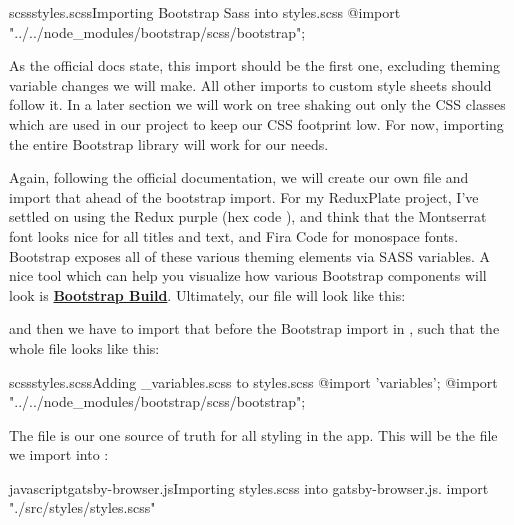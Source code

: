 \documentclass[paper=6in:9in,pagesize=pdftex,headinclude=on,footinclude=on,12pt,twoside]{scrbook}
\newcommand{\link}[2]{\textbf{\textcolor{monokaiPink}{\href{#2}{#1}}}}
\begin{document}
\begin{codeInput}{scss}{styles.scss}{Importing Bootstrap Sass into styles.scss}
@import "../../node_modules/bootstrap/scss/bootstrap";
\end{codeInput}

As the official docs state, this import should be the first one, excluding theming variable changes we will make. All other imports to custom style sheets should follow it. In a later section we will work on tree shaking out only the CSS classes which are used in our project to keep our CSS footprint low. For now, importing the entire Bootstrap library will work for our needs.


Again, following the official documentation, we will create our own  file and import that ahead of the bootstrap import. For my ReduxPlate project, I've settled on using the Redux purple (hex code ), and think that the Montserrat font looks nice for all titles and text, and Fira Code for monospace fonts. Bootstrap exposes all of these various theming elements via SASS variables. A nice tool which can help you visualize how various Bootstrap components will look is \link{Bootstrap Build}{https://bootstrap.build/app}. Ultimately, our  file will look like this:


and then we have to import that before the Bootstrap import in , such that the whole file looks like this:

\begin{codeInput}{scss}{styles.scss}{Adding \_variables.scss to styles.scss}
@import 'variables';
@import "../../node_modules/bootstrap/scss/bootstrap";
\end{codeInput}


The  file is our one source of truth for all styling in the app. This will be the file we import into :

\begin{codeInput}{javascript}{gatsby-browser.js}{Importing styles.scss into gatsby-browser.js.}
import "./src/styles/styles.scss"
\end{codeInput}
\end{document}
